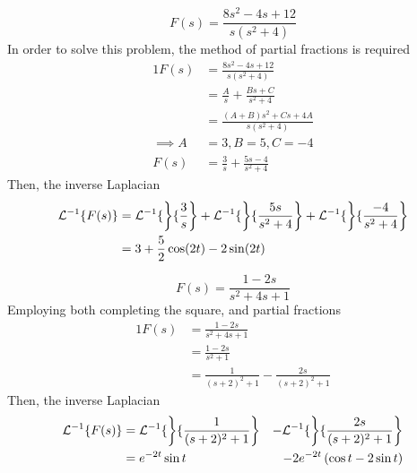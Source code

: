 \documentclass[diffeq.tex]{subfiles}
\begin{document}
    \begin{example}
        \begin{equation}
            F(s) = \frac{8s^{2} - 4s + 12}{s(s^{2} + 4)}
        \end{equation}
        In order to solve this problem, the method of partial fractions is required
        \begin{alignat}{1}
            F(s) &= \frac{8s^{2} - 4s + 12}{s(s^{2} + 4)}\\
            &= \frac{A}{s} + \frac{Bs + C}{s^{2} + 4}\\
            &= \frac{(A+B)s^{2} + Cs + 4A}{s(s^{2} + 4)}\\
            \implies A &= 3, B = 5, C = -4\\
            F(s) &= \frac{3}{s} + \frac{5s - 4}{s^{2} + 4}
        \end{alignat}
        Then, the inverse Laplacian
        \begin{alignat}{1}
            \mathcal{L}^{-1}\{F(s)\} &= \mathcal{L}^{-1}\{\left\}\{\frac{3}{s}\right\} + \mathcal{L}^{-1}\{\left\}\{\frac{5s}{s^{2} + 4}\right\} + \mathcal{L}^{-1}\{\left\}\{\frac{-4}{s^{2} + 4}\right\}\\
            &= 3 + \frac{5}{2}\cos(2t) - 2\sin(2t)
        \end{alignat}
    \end{example}
    \begin{example}
        \begin{equation}
            F(s) = \frac{1-2s}{s^{2} + 4s + 1}
        \end{equation}
        Employing both completing the square, and partial fractions
        \begin{alignat}{1}
            F(s) &= \frac{1-2s}{s^{2} + 4s + 1}\\
            &= \frac{1 - 2s}{s^{2} + 1}\\
            &= \frac{1}{(s + 2)^{2} + 1} - \frac{2s}{(s + 2)^{2} + 1}
        \end{alignat}
        Then, the inverse Laplacian
        \begin{alignat}{2}
            \mathcal{L}^{-1}\{F(s)\} &= \mathcal{L}^{-1}\{\left\}\{\frac{1}{(s + 2)^{2} + 1}\right\} &- \mathcal{L}^{-1}\{\left\}\{\frac{2s}{(s + 2)^{2} + 1}\right\}\\
            &= e^{-2t}\sin t &- 2e^{-2t}\left(\cos t - 2\sin t\right)
        \end{alignat}
    \end{example}
    \np
\end{document}
